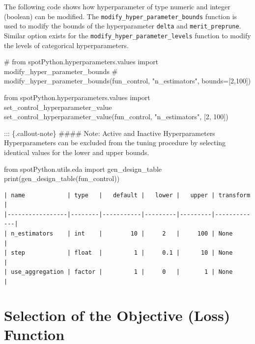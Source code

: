\documentclass[
  letterpaper,
  DIV=11,
  numbers=noendperiod]{scrreprt}
\newenvironment{Shaded}{\begin{snugshade}}{\end{snugshade}}
\newcommand{\BuiltInTok}[1]{\textcolor[rgb]{0.00,0.23,0.31}{#1}}
\newcommand{\CommentTok}[1]{\textcolor[rgb]{0.37,0.37,0.37}{#1}}
\newcommand{\DecValTok}[1]{\textcolor[rgb]{0.68,0.00,0.00}{#1}}
\newcommand{\ImportTok}[1]{\textcolor[rgb]{0.00,0.46,0.62}{#1}}
\newcommand{\NormalTok}[1]{\textcolor[rgb]{0.00,0.23,0.31}{#1}}
\newcommand{\StringTok}[1]{\textcolor[rgb]{0.13,0.47,0.30}{#1}}
\begin{document}
The following code shows how hyperparameter of type numeric and integer
(boolean) can be modified. The \texttt{modify\_hyper\_parameter\_bounds}
function is used to modify the bounds of the hyperparameter
\texttt{delta} and \texttt{merit\_preprune}. Similar option exists for
the \texttt{modify\_hyper\_parameter\_levels} function to modify the
levels of categorical hyperparameters.

\begin{Shaded}
\begin{Highlighting}[]
\CommentTok{\# from spotPython.hyperparameters.values import modify\_hyper\_parameter\_bounds}
\CommentTok{\# modify\_hyper\_parameter\_bounds(fun\_control, "n\_estimators", bounds=[2,100])}

\ImportTok{from}\NormalTok{ spotPython.hyperparameters.values }\ImportTok{import}\NormalTok{ set\_control\_hyperparameter\_value}
\NormalTok{set\_control\_hyperparameter\_value(fun\_control, }\StringTok{"n\_estimators"}\NormalTok{, [}\DecValTok{2}\NormalTok{, }\DecValTok{100}\NormalTok{])}
\end{Highlighting}
\end{Shaded}

::: \{.callout-note\} \#\#\#\# Note: Active and Inactive Hyperparameters
Hyperparameters can be excluded from the tuning procedure by selecting
identical values for the lower and upper bounds.

\begin{Shaded}
\begin{Highlighting}[]
\ImportTok{from}\NormalTok{ spotPython.utils.eda }\ImportTok{import}\NormalTok{ gen\_design\_table}
\BuiltInTok{print}\NormalTok{(gen\_design\_table(fun\_control))}
\end{Highlighting}
\end{Shaded}

\begin{verbatim}
| name            | type   |   default |   lower |   upper | transform   |
|-----------------|--------|-----------|---------|---------|-------------|
| n_estimators    | int    |        10 |     2   |     100 | None        |
| step            | float  |         1 |     0.1 |      10 | None        |
| use_aggregation | factor |         1 |     0   |       1 | None        |
\end{verbatim}

\section{Selection of the Objective (Loss)
Function}\label{selection-of-the-objective-loss-function}
\end{document}
